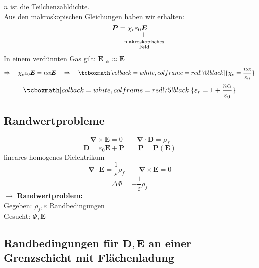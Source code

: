 \documentclass[titlepage,11pt,a4paper,ngerman]{report}
\newcommand{\tx}[1]{\textrm{#1}}
\newcommand{\verteq}{\rotatebox{90}{$\,=$}}
\newcommand{\equalto}[2]{\underset{\scriptstyle\overset{\mkern4mu\verteq}{#2}}{#1}}
\renewcommand{\Phi}{\varPhi}
\renewcommand{\vec}[1]{\boldsymbol{#1}}
\renewcommand{\epsilon}{\varepsilon}
\newcommand{\vabla}{\boldsymbol{\nabla}}
\newcommand{\rmbox}[1]{\tcboxmath[colback=white,colframe=red!75!black]{#1}}
\begin{document}
\noindent
$ n $ ist die Teilchenzahldichte.\\
Aus den makroskopischen Gleichungen haben wir erhalten:
\begin{equation*}
\vec{P} = \chi_e \epsilon_0 \equalto{\vec{E}}{\mathclap{ \substack{\tx{makroskopisches} \\ \tx{Feld} }}}
\end{equation*}
In einem verdünnten Gas gilt: $ \vec{E}_{\tx{lok}} \approx \vec{E} $
\begin{equation*}
\Rightarrow \quad \chi_e \epsilon_0 \vec{E} = n \alpha \vec{E} \quad \Rightarrow \quad \rmbox{\chi_e = \frac{n \alpha}{\epsilon_0}}
\end{equation*}
\begin{equation*}
\rmbox{\epsilon_r = 1 + \frac{n \alpha}{\epsilon_0}}
\end{equation*}

\subsection{Randwertprobleme}

\begin{equation*}
\vabla \times \vec{E} = 0 \qquad \vabla \cdot \vec{D} = \rho_f
\end{equation*}
\begin{equation*}
\vec{D} = \epsilon_0 \vec{E} + \vec{P} \qquad \vec{P} = \vec{P} (\vec{E})
\end{equation*}
lineares homogenes Dielektrikum
\begin{equation*}
\vabla \cdot \vec{E} = \frac{1}{\epsilon} \rho_f \qquad \vabla \times \vec{E} = 0
\end{equation*}
\begin{equation*}
\Delta \Phi = - \frac{1}{\epsilon} \rho_f
\end{equation*}
$ \rightarrow $ \textbf{Randwertproblem:}\\
Gegeben: $ \rho_f , \epsilon $ Randbedingungen\\
Gesucht: $ \Phi, \vec{E} $

\subsection{Randbedingungen für \texorpdfstring{$ \vec{D}, \vec{E} $}{D E} an einer Grenzschicht mit Flächenladung}
\end{document}
